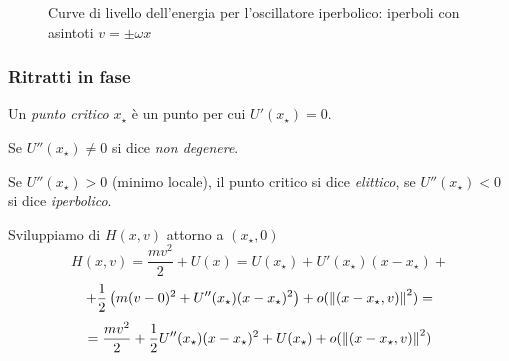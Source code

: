 \begin{example}
\begin{figure}[ht]
        \caption{Curve di livello dell'energia per l'oscillatore iperbolico: iperboli con asintoti $v=\pm\omega x$}
    \end{figure}

\end{example}



\subsubsection{Ritratti in fase}

\begin{definition}
    Un \textit{punto critico} $x_\star$ è un punto per cui $U'(x_\star)=0$.
\end{definition}
\begin{definition}
    Se $U''(x_\star)\neq 0 $ si dice \textit{non degenere}.
\end{definition}
\begin{definition}
    Se $U''(x_\star)>0$ (minimo locale), il punto critico si dice \textit{elittico}, se $U''(x_\star)<0$ si dice \textit{iperbolico}.   
\end{definition}

Sviluppiamo di $H(x,v)$ attorno a $(x_\star,0)$
\begin{equation*}
    H(x,v) = \frac{mv^2}{2} + U(x) = U(x_\star) + U'(x_\star)(x - x_\star) + 
\end{equation*}
\begin{equation*}
    + \frac{1}{2} \left( m(v-0)^2 +U''(x_\star)(x - x_\star)^2 \right) + o(\norm{(x - x_\star, v)}^2)=
\end{equation*}
\begin{equation}
    = \frac{mv^2}{2} + \frac{1}{2} U''(x_\star)(x - x_\star)^2 + U(x_\star) + o(\norm{(x - x_\star, v)}^2)
\end{equation}

